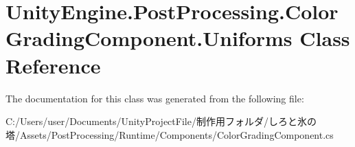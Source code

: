 \hypertarget{class_unity_engine_1_1_post_processing_1_1_color_grading_component_1_1_uniforms}{}\section{Unity\+Engine.\+Post\+Processing.\+Color\+Grading\+Component.\+Uniforms Class Reference}
\label{class_unity_engine_1_1_post_processing_1_1_color_grading_component_1_1_uniforms}


The documentation for this class was generated from the following file\+:\begin{DoxyCompactItemize}
\item 
C\+:/\+Users/user/\+Documents/\+Unity\+Project\+File/制作用フォルダ/しろと氷の塔/\+Assets/\+Post\+Processing/\+Runtime/\+Components/Color\+Grading\+Component.\+cs\end{DoxyCompactItemize}
